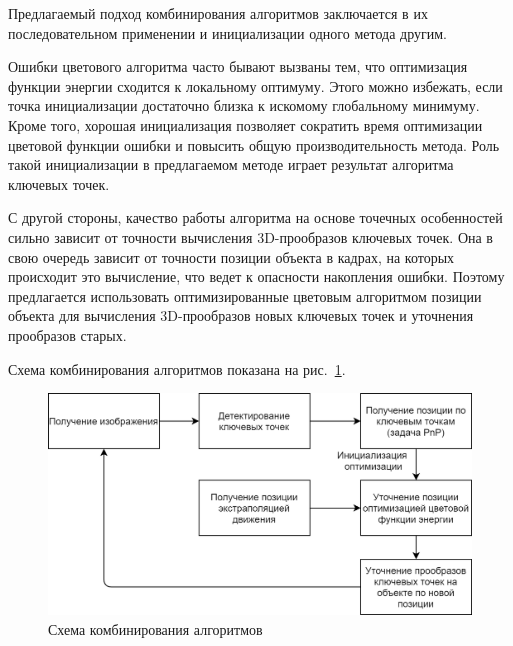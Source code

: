 
Предлагаемый подход комбинирования алгоритмов заключается в их последовательном
применении и инициализации одного метода другим.

Ошибки цветового алгоритма часто бывают вызваны тем, что оптимизация функции
энергии сходится к локальному оптимуму.
Этого можно избежать, если точка инициализации достаточно близка к искомому
глобальному минимуму.
Кроме того, хорошая инициализация позволяет сократить время оптимизации
цветовой функции ошибки и повысить общую производительность метода.
Роль такой инициализации в предлагаемом методе играет результат алгоритма
ключевых точек.

С другой стороны, качество работы алгоритма на основе точечных особенностей
сильно зависит от точности вычисления 3D-прообразов ключевых точек.
Она в свою очередь зависит от точности позиции объекта в кадрах, на которых
происходит это вычисление, что ведет к опасности накопления ошибки.
Поэтому предлагается использовать оптимизированные цветовым алгоритмом позиции
объекта для вычисления 3D-прообразов новых ключевых точек и уточнения
прообразов старых.

\newcommand{\XOld}{\ensuremath{\xvec_{\text {\it old}}}}
\newcommand{\XNew}{\ensuremath{\xvec_{\text{\it new}}}}
\newcommand{\ReprErr}[1]{\ensuremath{\vect{e}( #1 )}}

Схема комбинирования алгоритмов показана на рис.~\ref{fig:combining_schema}.

\begin{figure}[t]
    \centering
    \includegraphics[width=\textwidth]{fig/combining_schema.png}
    \caption{
        Схема комбинирования алгоритмов
    }
    \label{fig:combining_schema}
\end{figure}

